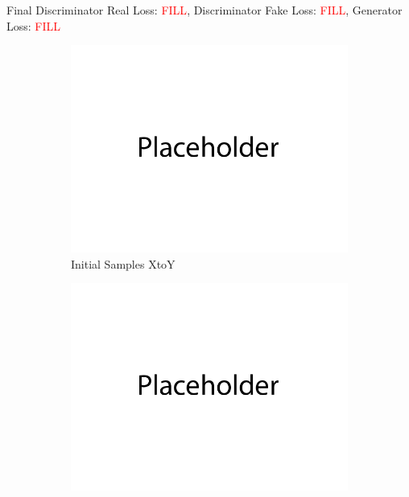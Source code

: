 \documentclass{article}
\begin{document}
\newpage




Final Discriminator Real Loss: \textcolor{red}{FILL}, Discriminator Fake Loss: \textcolor{red}{FILL}, Generator Loss: \textcolor{red}{FILL}
\begin{figure}[H]
         \centering
         \begin{subfigure}[b]{0.32\textwidth}
             \centering
             \includegraphics[width=\textwidth]{figures/q2_initial_samples_xy.png}
             \caption{Initial Samples XtoY}
         \end{subfigure}
         \hfill
         \begin{subfigure}[b]{0.32\textwidth}
             \centering
             \includegraphics[width=\textwidth]{figures/q2_intermediate_samples_xy.png}

\end{subfigure}
\end{figure}
\end{document}
